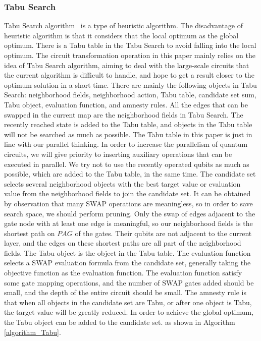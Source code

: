 \documentclass[runningheads]{llncs}
\begin{document}
\subsubsection{Tabu Search}
Tabu Search algorithm~\cite{Glover1990} is a type of heuristic algorithm. 
The disadvantage of heuristic algorithm is that it considers that the local optimum as the global optimum. 
There is a Tabu table in the Tabu Search to avoid falling into the local optimum.
The circuit transformation operation in this paper mainly relies on 
the idea of Tabu Search algorithm, 
aiming to deal with the large-scale circuits that the current algorithm is difficult to handle, 
and hope to get a result closer to the optimum solution in a short time.
There are mainly the following objects in Tabu Search: neighborhood fields, neighborhood action, 
Tabu table, candidate set sum, Tabu object, evaluation function, and amnesty rules.
All the edges that can be swapped in the current map are the neighborhood fields in Tabu Search.
The recently reached state is added to the Tabu table, 
and objects in the Tabu table will not be searched as much as possible. 
The Tabu table in this paper is just in line with our parallel thinking. 
In order to increase the parallelism of quantum circuits, we will give priority to inserting auxiliary operations 
that can be executed in parallel. We try not to use the recently operated qubits as much as possible, 
which are added to the Tabu table, in the same time.
The candidate set  selects several neighborhood objects with the best target value or evaluation value from the neighborhood fields
to join the candidate set. It can be obtained by observation that many SWAP operations are meaningless, 
so in order to save search space, we should perform pruning.
Only the swap of edges adjacent to the gate node with at least one edge is meaningful, 
so our neighborhood fields is the shortest path on $PAG$ of the gates. 
Their qubits are not adjacent to the current 
layer, and the edges on these shortest paths are all part of the neighborhood fields.
The Tabu object is the object in the Tabu table.
The evaluation function  selects a SWAP evaluation formula from the candidate set, 
generally taking the objective function as the evaluation function.
The evaluation function  satisfy some gate mapping operations, 
and the number of SWAP gates added should be small, and the depth of the entire circuit should be small.
The amnesty rule is that when all objects in the candidate set are Tabu, 
or after one object is Tabu, the target value will be greatly reduced. 
In order to achieve the global optimum, the Tabu object can be added to the candidate set. 
as shown in Algorithm \ref{algorithm_Tabu}.
\end{document}
